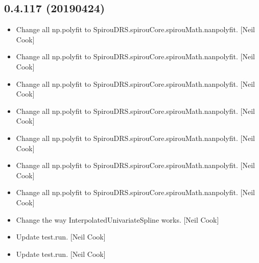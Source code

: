 \documentclass[a4paper,10pt,english]{report}
\begin{document}
\subsection{0.4.117 (2019\sphinxhyphen{}04\sphinxhyphen{}24)}
\label{\detokenize{misc/changelog:id163}}\begin{itemize}
\item {} 
Change all np.polyfit to SpirouDRS.spirouCore.spirouMath.nanpolyfit.
{[}Neil Cook{]}

\item {} 
Change all np.polyfit to SpirouDRS.spirouCore.spirouMath.nanpolyfit.
{[}Neil Cook{]}

\item {} 
Change all np.polyfit to SpirouDRS.spirouCore.spirouMath.nanpolyfit.
{[}Neil Cook{]}

\item {} 
Change all np.polyfit to SpirouDRS.spirouCore.spirouMath.nanpolyfit.
{[}Neil Cook{]}

\item {} 
Change all np.polyfit to SpirouDRS.spirouCore.spirouMath.nanpolyfit.
{[}Neil Cook{]}

\item {} 
Change all np.polyfit to SpirouDRS.spirouCore.spirouMath.nanpolyfit.
{[}Neil Cook{]}

\item {} 
Change all np.polyfit to SpirouDRS.spirouCore.spirouMath.nanpolyfit.
{[}Neil Cook{]}

\item {} 
Change the way InterpolatedUnivariateSpline works. {[}Neil Cook{]}

\item {} 
Update test.run. {[}Neil Cook{]}

\item {} 
Update test.run. {[}Neil Cook{]}

\end{itemize}
\end{document}
